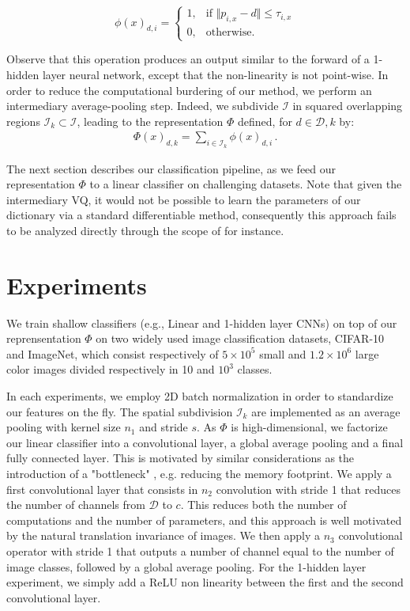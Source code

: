 \documentclass{article}
\begin{document}
{\begin{equation}
\phi(x)_{d,i}=
\begin{cases}
1,&\text{if } \Vert  p_{i,x} - d\Vert \leq \tau_{i,x}\\
0,&\text{otherwise}.
\end{cases}
\end{equation}






Observe that this operation produces an output similar to the forward of a 1-hidden layer neural network, except that the non-linearity is not point-wise. In order to reduce the computational burdering of our method, we perform an intermediary average-pooling step.
Indeed, we subdivide $\mathcal{I}$ in squared overlapping regions $\mathcal{I}_k\subset\mathcal{I}$, leading to the representation $\Phi$ defined, for $d\in\mathcal{D}, k$ by:
\begin{align*}\Phi(x)_{d,k}= \sum_{i\in \mathcal{I}_k}\phi(x)_{d,i}\,.\end{align*}

The next section describes our classification pipeline, as we feed our representation $\Phi$ to a linear classifier on challenging datasets. Note that given the intermediary VQ, it would not be possible to learn the parameters of our dictionary via a standard differentiable method, consequently this approach fails to be analyzed directly through the scope of \cite{chizat2018global} for instance.




\section{Experiments}
\label{experiments}
We train  shallow classifiers (e.g., Linear and 1-hidden layer CNNs) on top of our reprensentation $\Phi$ on two widely used image classification datasets,  CIFAR-10 and ImageNet, which consist respectively of $5\times10^5$ small and $1.2\times10^6$ large color images  divided respectively in 10 and $10^3$ classes.


In each experiments, we employ 2D batch normalization in order to standardize our features on the fly. The spatial subdivision $\mathcal{I}_k$ are implemented as an average pooling with kernel size $n_1$ and stride $s$. 
As  $\Phi$ is high-dimensional, we factorize our linear classifier into a convolutional layer, a global average pooling and a final fully connected layer. This is motivated by similar considerations as the introduction of a "bottleneck" \cite{he2016deep}, e.g. reducing the memory footprint. We apply a first convolutional layer that consists in $n_2$ convolution with stride 1 that reduces the number of channels from $\mathcal{D}$ to $c$. This reduces both the number of computations and the number of parameters, and this approach is well motivated by the natural translation invariance of images.
We then apply a $n_3$ convolutional operator with stride 1 that outputs a number of channel equal to the number of image classes, followed by a global average pooling.
For the 1-hidden layer experiment, we simply add a ReLU non linearity between the first and the second convolutional layer.

}
\end{document}
